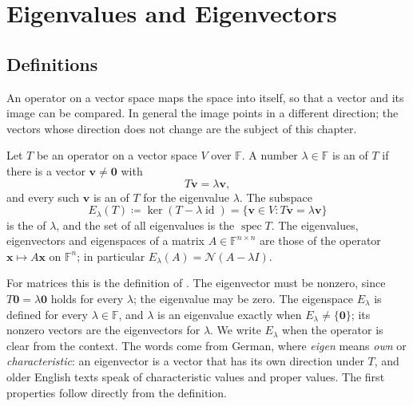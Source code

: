 \section{Eigenvalues and Eigenvectors}
\label{sec:eigen-definitions}

\subsection{Definitions}

An operator on a vector space maps the space into itself, so that a vector and its image can be compared. In general the image points in a different direction; the vectors whose direction does not change are the subject of this chapter.

\begin{definition}
\label{def:eigenvalue}
Let $T$ be an operator on a vector space $V$ over $\mathbb F$. A number $\lambda\in\mathbb F$ is an  of $T$ if there is a vector $\mathbf v\ne\mathbf 0$ with
\[
T\mathbf v=\lambda\mathbf v ,
\]
and every such $\mathbf v$ is an  of $T$ for the eigenvalue $\lambda$. The subspace
\[
E_\lambda(T)\coloneqq\ker(T-\lambda\operatorname{id})=\{\mathbf v\in V: T\mathbf v=\lambda\mathbf v\}
\]
is the  of $\lambda$, and the set of all eigenvalues is the  $\operatorname{spec}T$. The eigenvalues, eigenvectors and eigenspaces of a matrix $A\in\mathbb F^{n\times n}$ are those of the operator $\mathbf x\mapsto A\mathbf x$ on $\mathbb F^n$; in particular $E_\lambda(A)=\mathcal N(A-\lambda I)$.
\end{definition}

For matrices this is the definition of . The eigenvector must be nonzero, since $T\mathbf 0=\lambda\mathbf 0$ holds for every $\lambda$; the eigenvalue may be zero. The eigenspace $E_\lambda$ is defined for every $\lambda\in\mathbb F$, and $\lambda$ is an eigenvalue exactly when $E_\lambda\ne\{\mathbf 0\}$; its nonzero vectors are the eigenvectors for $\lambda$. We write $E_\lambda$ when the operator is clear from the context. The words come from German, where \emph{eigen} means \emph{own} or \emph{characteristic}: an eigenvector is a vector that has its own direction under $T$, and older English texts speak of characteristic values and proper values. The first properties follow directly from the definition.


